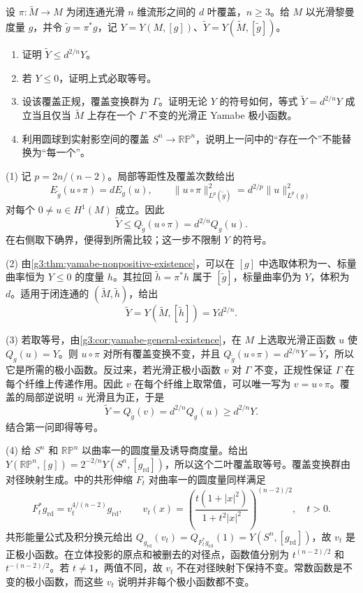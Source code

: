 \begin{exercise}\label{g3:ex:yamabe-spherical-quotient}
	设 \(\pi:\widetilde M\to M\) 为闭连通光滑 \(n\) 维流形之间的 \(d\) 叶覆盖，\(n\ge3\)。给 \(M\) 以光滑黎曼度量 \(g\)，并令 \(\widetilde g=\pi^*g\)，记 \(Y=Y(M,[g])\)、\(\widetilde Y=Y(\widetilde M,[\widetilde g])\)。
	\begin{enumerate}
		\item 证明 \(\widetilde Y\le d^{2/n}Y\)。
		\item 若 \(Y\le0\)，证明上式必取等号。
		\item 设该覆盖正规，覆盖变换群为 \(\Gamma\)。证明无论 \(Y\) 的符号如何，等式 \(\widetilde Y=d^{2/n}Y\) 成立当且仅当 \(\widetilde M\) 上存在一个 \(\Gamma\) 不变的光滑正 Yamabe 极小函数。
		\item 利用圆球到实射影空间的覆盖 \(S^n\to\mathbb{RP}^n\)，说明上一问中的“存在一个”不能替换为“每一个”。
	\end{enumerate}
\end{exercise}
\begin{solution}
	(1) 记 \(p=2n/(n-2)\)。局部等距性及覆盖次数给出
	\[
		E_{\widetilde g}(u\circ\pi)=dE_g(u),
		\qquad
		\|u\circ\pi\|_{L^p(\widetilde g)}^2=d^{2/p}\|u\|_{L^p(g)}^2
	\]
	对每个 \(0\ne u\in H^1(M)\) 成立。因此
	\[
		\widetilde Y\le Q_{\widetilde g}(u\circ\pi)=d^{2/n}Q_g(u).
	\]
	在右侧取下确界，便得到所需比较；这一步不限制 \(Y\) 的符号。

	(2) 由\cref{g3:thm:yamabe-nonpositive-existence}，可以在 \([g]\) 中选取体积为一、标量曲率恒为 \(Y\le0\) 的度量 \(h\)。其拉回 \(\widetilde h=\pi^*h\) 属于 \([\widetilde g]\)，标量曲率仍为 \(Y\)，体积为 \(d\)。适用于闭连通的 \((\widetilde M,\widetilde h)\)，给出
	\[
		\widetilde Y=Y(\widetilde M,[\widetilde h])
		=Yd^{2/n}.
	\]

	(3) 若取等号，由\cref{g3:cor:yamabe-general-existence}，在 \(M\) 上选取光滑正函数 \(u\) 使 \(Q_g(u)=Y\)。则 \(u\circ\pi\) 对所有覆盖变换不变，并且
	\(Q_{\widetilde g}(u\circ\pi)=d^{2/n}Y=\widetilde Y\)，所以它是所需的极小函数。反过来，若光滑正极小函数 \(v\) 对 \(\Gamma\) 不变，正规性保证 \(\Gamma\) 在每个纤维上传递作用。因此 \(v\) 在每个纤维上取常值，可以唯一写为 \(v=u\circ\pi\)。覆盖的局部逆说明 \(u\) 光滑且为正，于是
	\[
		\widetilde Y=Q_{\widetilde g}(v)=d^{2/n}Q_g(u)
		\ge d^{2/n}Y.
	\]
	结合第一问即得等号。

	(4) 给 \(S^n\) 和 \(\mathbb{RP}^n\) 以曲率一的圆度量及诱导商度量。给出
	\(Y(\mathbb{RP}^n,[g])=2^{-2/n}Y(S^n,[g_{\mathrm{rd}}])\)，所以这个二叶覆盖取等号。覆盖变换群由对径映射生成。中的共形伸缩 \(F_t\) 对曲率一的圆度量同样满足
	\[
		F_t^*g_{\mathrm{rd}}=v_t^{4/(n-2)}g_{\mathrm{rd}},
		\qquad
		v_t(x)=\left(\frac{t(1+|x|^2)}{1+t^2|x|^2}\right)^{(n-2)/2},
		\quad t>0.
	\]
	共形能量公式及积分换元给出
	\(Q_{g_{\mathrm{rd}}}(v_t)=Q_{F_t^*g_{\mathrm{rd}}}(1)=Y(S^n,[g_{\mathrm{rd}}])\)，故 \(v_t\) 是正极小函数。在立体投影的原点和被删去的对径点，函数值分别为 \(t^{(n-2)/2}\) 和 \(t^{-(n-2)/2}\)。若 \(t\ne1\)，两值不同，故 \(v_t\) 不在对径映射下保持不变。常数函数是不变的极小函数，而这些 \(v_t\) 说明并非每个极小函数都不变。
\end{solution}

